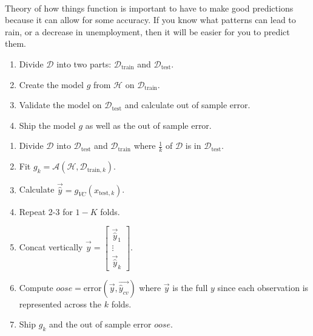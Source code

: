 \documentclass[12pt]{article}
\begin{document}
\begin{enumerate}
 \\ Theory of how things function is important to have to make good predictions because it can allow for some accuracy. If you know what patterns can lead to rain, or a decrease in unemployment, then it will be easier for you to predict them. 

\end{enumerate}




\begin{enumerate}

 \begin{enumerate} 
\item Divide $\mathcal{D}$ into two parts: $\mathcal{D}_{\text{train}}$ and $\mathcal{D}_{\text{test}}$. 
\item Create the model $g$ from $\mathcal{H}$ on $\mathcal{D}_{\text{train}}$. 
\item Validate the model on $\mathcal{D}_{\text{test}}$ and calculate out of sample error. 
\item Ship the model $g$ as well as the out of sample error. \end{enumerate} 

 \begin{enumerate} 
\item Divide $\mathcal{D}$ into $\mathcal{D}_{\text{test}}$ and $\mathcal{D}_{\text{train}}$ where $\frac{1}{k}$ of $\mathcal{D}$ is in $\mathcal{D}_{\text{test}}$. 
\item Fit $g_k = \mathcal{A}(\mathcal{H}, \mathcal{D}_{\text{train}, k})$.
\item Calculate $\vec{\hat{y}} = g_{VC}(x_{\text{test}, k})$. 
\item Repeat 2-3 for $1-K$ folds.
\item Concat vertically $\vec{\hat{y}} = \begin{bmatrix} \vec{\hat{y}}_1 \\ \vdots \\ \vec{\hat{y}}_k \end{bmatrix} $.
\item Compute $oose = \text{error}(\vec{y}, \vec{\hat{y}_{cv}})$ where $\vec{y}$ is the full $y$ since each observation is represented across the $k$ folds.
\item Ship $g_k$ and the out of sample error $oose$. \end{enumerate} 


\end{enumerate}
\end{document}
